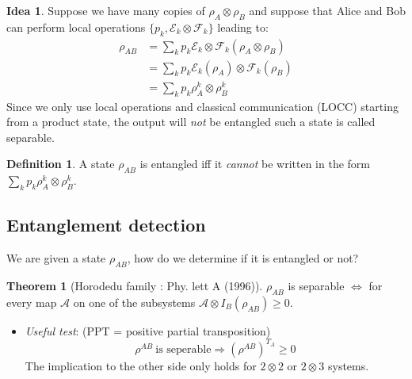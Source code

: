 \documentclass[12pt]{book}
\theoremstyle{definition}
\newtheorem*{defi}{\bfseries Definition}
\newtheorem*{theo}{\bfseries Theorem}
\newtheorem*{idea}{\bfseries Idea}
\let\oldsum\sum
\renewcommand{\sum}[2]{\oldsum\limits_{#1}^{#2}}
\newcommand{\para}[1]{\left( {#1} \right)}
\begin{document}
\begin{idea}
  Suppose we have many copies of $\rho_A \otimes \rho_B$ and suppose that Alice and Bob can perform  local operations $\{p_k, \mathcal E_k \otimes \mathcal F_k\}$ leading to:
  \begin{align*}
    \rho_{AB} & = \oldsum_k p_k \mathcal E_k \otimes \mathcal F_k (\rho_A \otimes \rho_B) \\
    & = \oldsum_k p_k \mathcal E_k(\rho_A) \otimes \mathcal F_k(\rho_B) \\
    & = \oldsum_k p_k \rho_A^k \otimes \rho_B^k
  \end{align*}
  Since we only use local operations and classical communication (LOCC) starting from a product state, the output will \emph{not} be entangled such a state is called separable.
\end{idea}

\begin{defi}
    A state $\rho_{AB}$ is entangled iff it \emph{cannot} be written in the form $\oldsum_k p_k \rho_A^k \otimes \rho_B^k$.
\end{defi}

\subsection{Entanglement detection}
We are given a state $\rho_{AB}$, how do we determine if it is entangled or not?
\begin{theo}[Horodedu family : Phy. lett A (1996)]

  $\rho_{AB}$ is separable $\iff$ for every  map $\mathcal A$ on one of the subsystems $\mathcal A \otimes I_B (\rho_{AB}) \geq 0$.
  \end{theo}
\begin{itemize}
  \item \emph{Useful test}: (PPT = positive partial transposition) \\
  \begin{equation}
    \rho^{AB}\: \textrm{is seperable} \Longrightarrow \para{\rho^{AB}}^{T_A} \geq 0
  \end{equation}
  The implication to the other side only holds for $2 \otimes 2$ or $2 \otimes 3$ systems.
\end{itemize}
\end{document}
